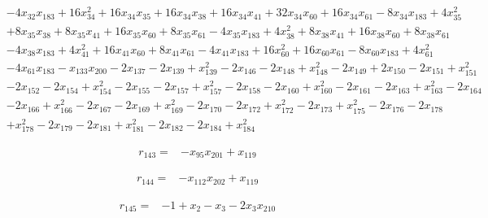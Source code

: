 \begin{align*}
&-4x_{32}x_{183}+16x_{34}^{2}+16x_{34}x_{35}+16x_{34}x_{38}+16x_{34}x_{41}+32x_{34}x_{60}+16x_{34}x_{61}-8x_{34}x_{183}+4x_{35}^{2}\\
&+8x_{35}x_{38}+8x_{35}x_{41}+16x_{35}x_{60}+8x_{35}x_{61}-4x_{35}x_{183}+4x_{38}^{2}+8x_{38}x_{41}+16x_{38}x_{60}+8x_{38}x_{61}\\
&-4x_{38}x_{183}+4x_{41}^{2}+16x_{41}x_{60}+8x_{41}x_{61}-4x_{41}x_{183}+16x_{60}^{2}+16x_{60}x_{61}-8x_{60}x_{183}+4x_{61}^{2}\\
&-4x_{61}x_{183}-x_{133}x_{200}-2x_{137}-2x_{139}+x_{139}^{2}-2x_{146}-2x_{148}+x_{148}^{2}-2x_{149}+2x_{150}-2x_{151}+x_{151}^{2}\\
&-2x_{152}-2x_{154}+x_{154}^{2}-2x_{155}-2x_{157}+x_{157}^{2}-2x_{158}-2x_{160}+x_{160}^{2}-2x_{161}-2x_{163}+x_{163}^{2}-2x_{164}\\
&-2x_{166}+x_{166}^{2}-2x_{167}-2x_{169}+x_{169}^{2}-2x_{170}-2x_{172}+x_{172}^{2}-2x_{173}+x_{175}^{2}-2x_{176}-2x_{178}\\
&+x_{178}^{2}-2x_{179}-2x_{181}+x_{181}^{2}-2x_{182}-2x_{184}+x_{184}^{2}
\end{align*}

\begin{align*}
r_{143}={}&-x_{95}x_{201}+x_{119}
\end{align*}

\begin{align*}
r_{144}={}&-x_{112}x_{202}+x_{119}
\end{align*}

\begin{align*}
r_{145}={}&-1+x_{2}-x_{3}-2x_{3}x_{210}
\end{align*}

